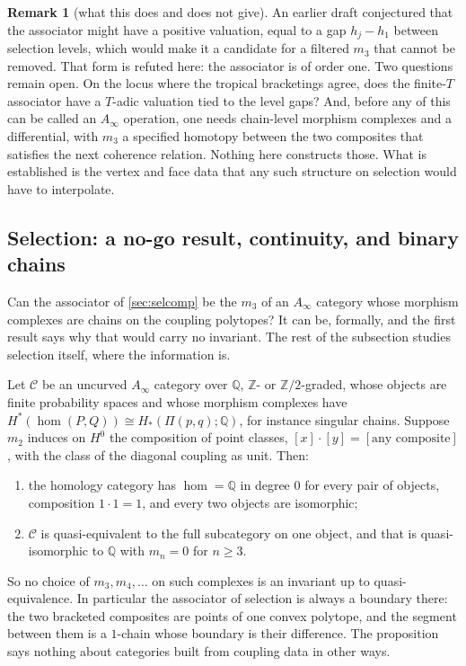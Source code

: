 \documentclass[11pt]{article}
\theoremstyle{definition}\newtheorem{definition}[theorem]{Definition}\newtheorem{remark}[theorem]{Remark}\newtheorem{example}[theorem]{Example}\newtheorem{problem}[theorem]{Open problem}\crefname{problem}{Problem}{Problems}
\begin{document}
\begin{remark}[what this does and does not give]\label{rem:selcomp}
An earlier draft conjectured that the associator might have a positive valuation, equal to a gap $h_j-h_1$ between selection levels, which would make it a candidate for a filtered $m_3$ that cannot be removed.
That form is refuted here: the associator is of order one. Two questions remain open. On the locus where the tropical bracketings agree, does the finite-$T$ associator have a $T$-adic valuation tied
to the level gaps? And, before any of this can be called an $A_\infty$ operation, one needs chain-level morphism complexes and a differential, with $m_3$ a specified homotopy between the two composites
that satisfies the next coherence relation. Nothing here constructs those. What is established is the vertex and face data that any such structure on selection would have to interpolate.
\end{remark}

\subsection{Selection: a no-go result, continuity, and binary chains}\label{sec:selbin}
Can the associator of \cref{sec:selcomp} be the $m_3$ of an $A_\infty$ category whose morphism complexes are chains on the coupling polytopes? It can be, formally, and the first result says why that
would carry no invariant. The rest of the subsection studies selection itself, where the information is.

\begin{proposition}\label{prop:nogo}
Let $\mathcal C$ be an uncurved $A_\infty$ category over $\mathbb Q$, $\mathbb Z$- or $\mathbb Z/2$-graded, whose objects are finite probability spaces and whose morphism complexes have
$H^*(\hom(P,Q))\cong H_*(\Pi(p,q);\mathbb Q)$, for instance singular chains. Suppose $m_2$ induces on $H^0$ the composition of point classes, $[x]\cdot[y]=[\text{any composite}]$, with the class of the
diagonal coupling as unit. Then:
\begin{enumerate}
\item[(1)] the homology category has $\hom=\mathbb Q$ in degree $0$ for every pair of objects, composition $1\cdot1=1$, and every two objects are isomorphic;
\item[(2)] $\mathcal C$ is quasi-equivalent to the full subcategory on one object, and that is quasi-isomorphic to $\mathbb Q$ with $m_n=0$ for $n\ge3$.
\end{enumerate}
So no choice of $m_3,m_4,\dots$ on such complexes is an invariant up to quasi-equivalence. In particular the associator of selection is always a boundary there: the two bracketed composites are
points of one convex polytope, and the segment between them is a $1$-chain whose boundary is their difference. The proposition says nothing about categories built from coupling data in other ways.
\end{proposition}
\end{document}
